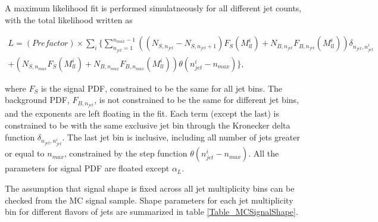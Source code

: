 \documentclass{cmspaper}
\begin{document}
A maximum likelihood fit is performed simulatneously for all different
jet counts, with the total likelihood written as

\begin{eqnarray}
L = (Prefactor) \times \displaystyle\sum_i \{ \displaystyle\sum_{n_{jet}=1}^{n_{max} - 1} \left( (N_{S, n_{jet}} - N_{S, n_{jet} + 1}) F_S(M_{ll}^i) + N_{B, n_{jet}} F_{B, n_{jet}}(M_{ll}^i) \right)
\delta_{n_{jet}, n_{jet}^i}\nonumber\\
+ \left( N_{S, n_{max}} F_S(M_{ll}^i) + N_{B, n_{max}} F_{B, n_{max}}(M_{ll}^i) \right) \theta(n_{jet}^i - n_{max}) \},
\nonumber
\end{eqnarray}

where $F_S$ is the signal PDF, constrained to be the same for all jet
bins.  The background PDF, $F_{B, n_{jet}}$, is not constrained to be
the same for different jet bins, and the exponents are left floating
in the fit.  Each term (except the last) is constrained to be with the
same exclusive jet bin through the Kronecker delta function
$\delta_{n_{jet}, n_{jet}^i}$.  The last jet bin is inclusive,
including all number of jets greater or equal to $n_{max}$,
constrained by the step function $\theta(n_{jet}^i - n_{max})$.  All
the parameters for signal PDF are floated except $\alpha_L$.

The assumption that signal shape is fixed across all jet multiplicity
bins can be checked from the MC signal sample.  Shape parameters for
each jet multiplicity bin for different flavors of jets are summarized
in table \ref{Table_MCSignalShape}.
\end{document}
